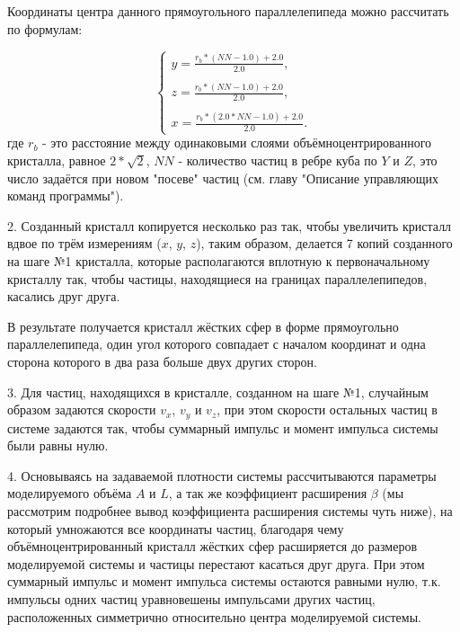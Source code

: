 \documentclass[a4paper]{article}
\begin{document}
Координаты центра данного прямоугольного параллелепипеда можно рассчитать по формулам:

\begin{equation}\label{eq:r_scalar}
    \begin{cases}
        y = \displaystyle\frac{r_b * (NN - 1.0) + 2.0}{2.0},
        \\
        \\
        z = \displaystyle\frac{r_b * (NN - 1.0) + 2.0}{2.0},
        \\
        \\
        x = \displaystyle\frac{r_b * (2.0 * NN - 1.0) + 2.0}{2.0}.
    \end{cases}
\end{equation}
где $ r_b $ - это расстояние между одинаковыми слоями объёмноцентрированного кристалла, равное $ 2*\sqrt{2} $, $ NN $ - количество частиц в ребре куба по $ Y $ и $ Z $, это число задаётся при новом "посеве" частиц (см. главу "Описание управляющих команд программы").

2. Созданный кристалл копируется несколько раз так, чтобы увеличить кристалл вдвое по трём измерениям ($x$, $y$, $z$), таким образом, делается 7 копий созданного на шаге №1 кристалла, которые располагаются вплотную к первоначальному кристаллу так, чтобы частицы, находящиеся на границах параллелепипедов, касались друг друга.

В результате получается кристалл жёстких сфер в форме прямоугольно параллелепипеда, один угол которого совпадает с началом координат и одна сторона которого в два раза больше двух других сторон.

3. Для частиц, находящихся в кристалле, созданном на шаге №1, случайным образом задаются скорости $ v_x $, $ v_y $ и $ v_z $, при этом скорости остальных частиц в системе задаются так, чтобы суммарный импульс и момент импульса системы были равны нулю.

4. Основываясь на задаваемой плотности системы рассчитываются параметры моделируемого объёма $ A $ и $ L $, а так же коэффициент расширения $ \beta $ (мы рассмотрим подробнее вывод коэффициента расширения системы чуть ниже), на который умножаются все координаты частиц, благодаря чему объёмноцентрированный кристалл жёстких сфер расширяется до размеров моделируемой системы и частицы перестают касаться друг друга. При этом суммарный импульс и момент импульса системы остаются равными нулю, т.к. импульсы одних частиц уравновешены импульсами других частиц, расположенных симметрично относительно центра моделируемой системы.
\end{document}
